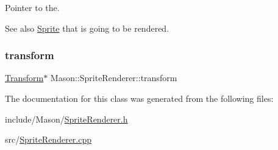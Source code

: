 Pointer to the. 

\begin{DoxySeeAlso}{See also}
\hyperlink{class_mason_1_1_sprite}{Sprite} that is going to be rendered. 
\end{DoxySeeAlso}
\hypertarget{class_mason_1_1_sprite_renderer_a211ffbdb50dae44315ff54ce808409bc}{}\label{class_mason_1_1_sprite_renderer_a211ffbdb50dae44315ff54ce808409bc} 
\subsubsection{\texorpdfstring{transform}{transform}}
{\footnotesize\ttfamily \hyperlink{class_mason_1_1_transform}{Transform}$\ast$ Mason\+::\+Sprite\+Renderer\+::transform\hspace{0.3cm}{\ttfamily [protected]}}



The documentation for this class was generated from the following files\+:\begin{DoxyCompactItemize}
\item 
include/\+Mason/\hyperlink{_sprite_renderer_8h}{Sprite\+Renderer.\+h}\item 
src/\hyperlink{_sprite_renderer_8cpp}{Sprite\+Renderer.\+cpp}\end{DoxyCompactItemize}
